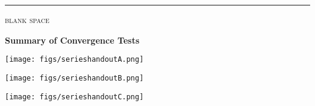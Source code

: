 \documentclass[11pt]{amsart}
\begin{document}
\noindent \hrule
\begin{center}
\small
\bigskip
\textsc{blank space}
\end{center}
\vspace{3.0in}


\clearpage\newpage
\large\centerline{\textbf{Summary of Convergence Tests}}
\normalsize

\begin{center}
\texttt{[image: figs/serieshandoutA.png]}
\end{center}
\vfill


\clearpage\newpage
\begin{center}
\texttt{[image: figs/serieshandoutB.png]}

\vspace{-2mm}
\texttt{[image: figs/serieshandoutC.png]}
\end{center}
\vfill
\end{document}
